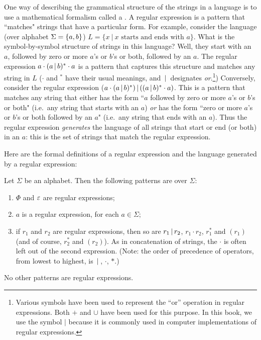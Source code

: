 One way of describing the grammatical structure of the strings in a language is
to use a mathematical formalism called a .  A regular
expression is a pattern that ``matches" strings that have a particular form.  For
example, consider the language (over alphabet $\Sigma = \mbox{$\{a,b\}$}$) $L= \{x \ | \ x
\mbox{\ starts and ends with\ } a\}$.  What is the symbol-by-symbol 
structure of
strings in this language?  Well, they start with an $a$, followed by zero or more
$a$'s or $b$'s or both, followed by an $a$.  The regular expression 
$a \cdot (a \hbox{$\,|\,$} b)^* \cdot a$ is a pattern that captures this structure and matches any string in
$L$ ($\cdot$ and $^*$ have their usual meanings, and $\hbox{$\,|\,$} $ designates {\em or}.\footnote{Various
symbols have been used to represent the ``or'' operation in regular expressions.  Both
$+$ and $\cup$ have been used for this purpose.  In this book, we use the symbol $|$ because
it is commonly used in computer implementations of regular expressions.}) 
Conversely, consider the regular expression ($a\cdot(a\hbox{$\,|\,$} b)^*) \hbox{$\,|\,$}  ((a\hbox{$\,|\,$} b)^*\cdot a)$.
This is a pattern that matches any string that either has the form ``$a$ followed
by zero or more $a$'s or $b$'s or both" (i.e.\ any string that starts with an $a$)
{\em or} has the form ``zero or more $a$'s or $b$'s or both followed by an $a$"
(i.e.\ any string that ends with an $a$).  Thus the regular expression 
{\em generates} the language of all strings that start or end (or both) in an
$a$: this is the set of strings that match the regular expression. 

Here are the formal definitions of a regular expression and the language
generated by a regular expression:

\begin{definition}
Let $\Sigma$ be an alphabet.  Then the 
following patterns are  over $\Sigma$:
\begin{enumerate}
\item $\Phi$ and $\varepsilon$ are regular expressions;
\item $a$ is a regular expression, for each $a \in \Sigma$;
\item if $r_1$ and $r_2$ are regular expressions, then so are
$r_1\hbox{$\,|\,$} r_2$, $r_1\cdot r_2$, $r_1^*$ and $(r_1)$ (and of course, $r_2^*$
and $(r_2)$).
As in concatenation of strings, the $\cdot$ is often left out of
the second expression.  (Note: the order of precedence of operators, from lowest to highest,
is $\hbox{$\,|\,$} $, $\cdot$, $*$.)
\end{enumerate}
No other patterns are regular expressions.
\end{definition}

